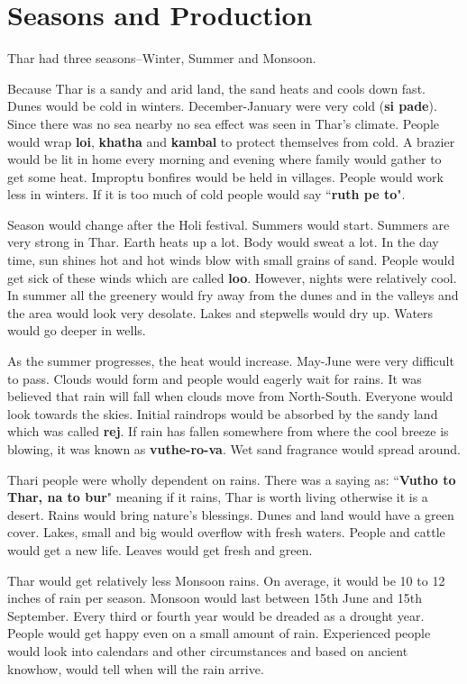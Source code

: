 \chapter{Seasons and Production}
Thar had three seasons--Winter, Summer and Monsoon.

Because Thar is a sandy and arid land, the sand heats and cools down fast.
Dunes would be cold in winters. December-January were very cold (\textbf{si
pade}). Since there was no sea nearby no sea effect was seen in Thar's climate.
People would wrap \textbf{loi}, \textbf{khatha} and \textbf{kambal} to protect
themselves from cold. A brazier would be lit in home every morning and evening
where family would gather to get some heat. Improptu bonfires would be held in
villages. People would work less in winters. If it is too much of cold people
would say ``\textbf{ruth pe to}".

Season would change after the Holi festival. Summers would start. Summers are
very strong in Thar. Earth heats up a lot. Body would sweat a lot. In the day
time, sun shines hot and hot winds blow with small grains of sand. People would
get sick of these winds which are called \textbf{loo}. However, nights were
relatively cool. In summer all the greenery would fry away from the dunes and
in the valleys and the area would look very desolate. Lakes and stepwells would
dry up. Waters would go deeper in wells.

As the summer progresses, the heat would increase. May-June were very difficult
to pass. Clouds would form and people would eagerly wait for rains. It was
believed that rain will fall when clouds move from North-South. Everyone would
look towards the skies. Initial raindrops would be absorbed by the sandy land
which was called \textbf{rej}. If rain has fallen somewhere from where the cool
breeze is blowing, it was known as \textbf{vuthe-ro-va}. Wet sand fragrance
would spread around.

Thari people were wholly dependent on rains. There was a saying as:
``\textbf{Vutho to Thar, na to bur}" meaning if it rains, Thar is worth living
otherwise it is a desert. Rains would bring nature's blessings. Dunes and land
would have a green cover. Lakes, small and big would overflow with fresh
waters. People and cattle would get a new life. Leaves would get fresh and
green.

Thar would get relatively less Monsoon rains. On average, it would be 10 to 12
inches of rain per season. Monsoon would last between 15th June and 15th
September. Every third or fourth year would be dreaded as a drought year.
People would get happy even on a small amount of rain. Experienced people would
look into calendars and other circumstances and based on ancient knowhow, would
tell when will the rain arrive.

